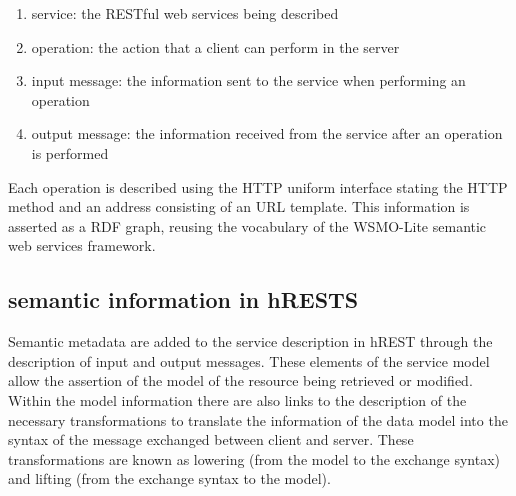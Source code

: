 \begin{enumerate}
  \item service: the RESTful web services being described
  \item operation: the action that a client can perform in the server
  \item input message: the information sent to the service when performing an operation
  \item output message: the information received from the service after an operation is performed
\end{enumerate}

Each operation is described using the HTTP uniform interface stating the HTTP method and an address consisting of an URL template. This information is asserted as a RDF graph, reusing the vocabulary of the WSMO-Lite semantic web services framework.

\subsection{semantic information in hRESTS}
Semantic metadata are added to the service description in hREST through the description of input and output messages. These elements of the service model allow the assertion of the model of the resource being retrieved or modified.\\
Within the model information there are also links to the description of the necessary transformations to translate the information of the data model into the syntax of the message exchanged between client and server. These transformations are known as lowering (from the model to the exchange syntax) and lifting (from the exchange syntax to the model).

